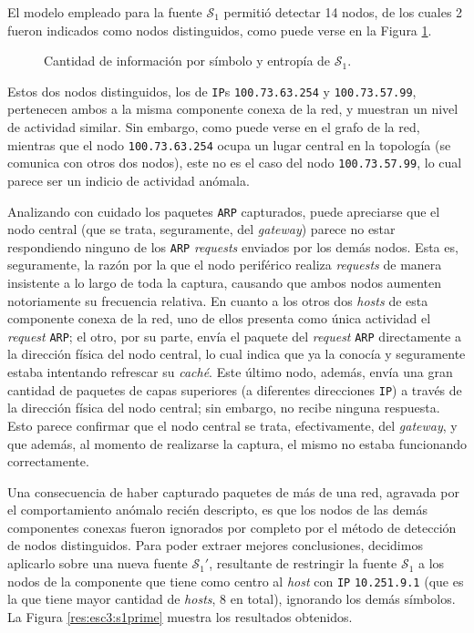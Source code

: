 El modelo empleado para la fuente $\mathcal{S}_1$ permitió detectar 14 nodos,
de los cuales 2 fueron indicados como nodos distinguidos, como puede verse
en la Figura \ref{res:esc3:s1}.

\begin{figure}[H]
    \caption{Cantidad de información por símbolo y entropía de $\mathcal{S}_1$.}
    \label{res:esc3:s1}
\end{figure}

Estos dos nodos distinguidos, los de \texttt{IP}s \texttt{100.73.63.254} y
\texttt{100.73.57.99}, pertenecen ambos a la misma componente conexa de la
red, y muestran un nivel de actividad similar. Sin embargo, como puede verse
en el grafo de la red, mientras que el nodo \texttt{100.73.63.254} ocupa
un lugar central en la topología (se comunica con otros dos nodos), este no
es el caso del nodo \texttt{100.73.57.99}, lo cual parece ser un indicio de
actividad anómala.

Analizando con cuidado los paquetes \texttt{ARP} capturados, puede apreciarse
que el nodo central (que se trata, seguramente, del \emph{gateway}) parece no
estar respondiendo ninguno de los \texttt{ARP} \emph{requests} enviados por
los demás nodos. Esta es, seguramente, la razón por la que el nodo periférico
realiza \emph{requests} de manera insistente a lo largo de toda la captura,
causando que ambos nodos aumenten notoriamente su frecuencia relativa. En
cuanto a los otros dos \emph{hosts} de esta componente conexa de la red, uno
de ellos presenta como única actividad el \emph{request} \texttt{ARP}; el
otro, por su parte, envía el paquete del \emph{request} \texttt{ARP}
directamente a la dirección física del nodo central, lo cual indica que ya la
conocía y seguramente estaba intentando refrescar su \emph{caché}. Este último
nodo, además, envía una gran cantidad de paquetes de capas superiores (a
diferentes direcciones \texttt{IP}) a través de la dirección física del nodo
central; sin embargo, no recibe ninguna respuesta. Esto parece confirmar que
el nodo central se trata, efectivamente, del \emph{gateway}, y que además, al
momento de realizarse la captura, el mismo no estaba funcionando
correctamente.

Una consecuencia de haber capturado paquetes de más de una red, agravada por
el comportamiento anómalo recién descripto, es que los nodos de las demás
componentes conexas fueron ignorados por completo por el método de detección
de nodos distinguidos. Para poder extraer mejores conclusiones, decidimos
aplicarlo sobre una nueva fuente $\mathcal{S}_1'$, resultante de restringir la
fuente $\mathcal{S}_1$ a los nodos de la componente que tiene como centro al
\emph{host} con \texttt{IP} \texttt{10.251.9.1} (que es la que tiene mayor
cantidad de \emph{hosts}, 8 en total), ignorando los demás símbolos. La Figura
\ref{res:esc3:s1prime} muestra los resultados obtenidos.

